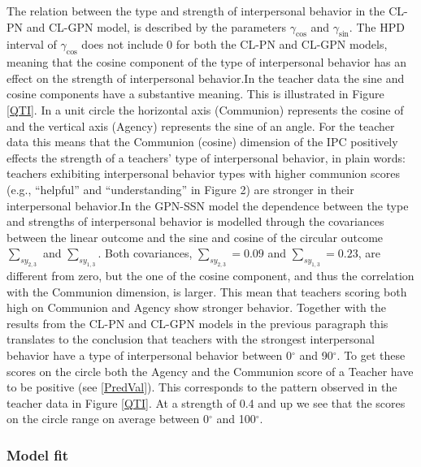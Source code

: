 \documentclass[man]{apa6}
\theoremstyle{definition}
\theoremstyle{definition}
\theoremstyle{definition}
\theoremstyle{remark}
\begin{document}
The relation between the type and strength of interpersonal behavior in
the CL-PN and CL-GPN model, is described by the parameters
\(\gamma_{\cos}\) and \(\gamma_{\sin}\). The HPD interval of
\(\gamma_{\cos}\) does not include 0 for both the CL-PN and CL-GPN
models, meaning that the cosine component of the type of interpersonal
behavior has an effect on the strength of interpersonal
behavior.\newline \indent In the teacher data the sine and cosine
components have a substantive meaning. This is illustrated in Figure
\ref{QTI}. In a unit circle the horizontal axis (Communion) represents
the cosine of and the vertical axis (Agency) represents the sine of an
angle. For the teacher data this means that the Communion (cosine)
dimension of the IPC positively effects the strength of a teachers' type
of interpersonal behavior, in plain words: teachers exhibiting
interpersonal behavior types with higher communion scores (e.g.,
\enquote{helpful} and \enquote{understanding} in Figure 2) are stronger
in their interpersonal behavior.\newline  \indent In the GPN-SSN model
the dependence between the type and strengths of interpersonal behavior
is modelled through the covariances between the linear outcome and the
sine and cosine of the circular outcome \(\sum_{sy_{2,3}}\) and
\(\sum_{sy_{1,3}}\). Both covariances, \(\sum_{sy_{2,3}} = 0.09\) and
\(\sum_{sy_{1,3}} = 0.23\), are different from zero, but the one of the
cosine component, and thus the correlation with the Communion dimension,
is larger. This mean that teachers scoring both high on Communion and
Agency show stronger behavior. Together with the results from the CL-PN
and CL-GPN models in the previous paragraph this translates to the
conclusion that teachers with the strongest interpersonal behavior have
a type of interpersonal behavior between 0\(^\circ\) and 90\(^\circ\).
To get these scores on the circle both the Agency and the Communion
score of a Teacher have to be positive (see \eqref{PredVal}). This
corresponds to the pattern observed in the teacher data in Figure
\ref{QTI}. At a strength of 0.4 and up we see that the scores on the
circle range on average between 0\(^\circ\) and 100\(^\circ\).

\subsubsection{Model fit}
\end{document}
